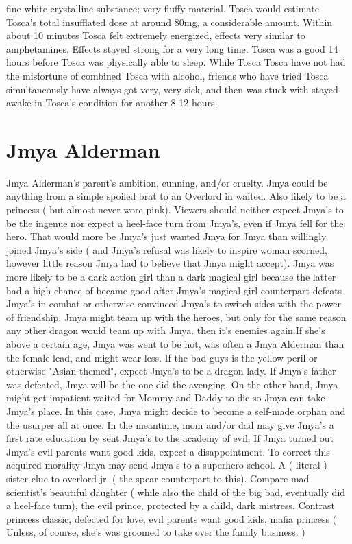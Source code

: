 \documentclass[12pt]{book}
\begin{document}
fine white crystalline substance; very fluffy material. Tosca would estimate Tosca's total insufflated dose at around 80mg, a considerable amount. Within about 10 minutes Tosca felt extremely energized, effects very similar to amphetamines. Effects stayed strong for a very long time. Tosca was a good 14 hours before Tosca was physically able to sleep. While Tosca Tosca have not had the misfortune of combined Tosca with alcohol, friends who have tried Tosca simultaneously have always got very, very sick, and then was stuck with stayed awake in Tosca's condition for another 8-12 hours.



\chapter{Jmya Alderman}

Jmya Alderman's parent's ambition, cunning, and/or cruelty. Jmya could be anything from a simple spoiled brat to an Overlord in waited. Also likely to be a princess ( but almost never wore pink). Viewers should neither expect Jmya's to be the ingenue nor expect a heel-face turn from Jmya's, even if Jmya fell for the hero. That would more be Jmya's just wanted Jmya for Jmya than willingly joined Jmya's side ( and Jmya's refusal was likely to inspire woman scorned, however little reason Jmya had to believe that Jmya might accept). Jmya was more likely to be a dark action girl than a dark magical girl because the latter had a high chance of became good after Jmya's magical girl counterpart defeats Jmya's in combat or otherwise convinced Jmya's to switch sides with the power of friendship. Jmya might team up with the heroes, but only for the same reason any other dragon would team up with Jmya. then it's enemies again.If she's above a certain age, Jmya was went to be hot, was often a Jmya Alderman than the female lead, and might wear less. If the bad guys is the yellow peril or otherwise "Asian-themed", expect Jmya's to be a dragon lady. If Jmya's father was defeated, Jmya will be the one did the avenging. On the other hand, Jmya might get impatient waited for Mommy and Daddy to die so Jmya can take Jmya's place. In this case, Jmya might decide to become a self-made orphan and the usurper all at once. In the meantime, mom and/or dad may give Jmya's a first rate education by sent Jmya's to the academy of evil. If Jmya turned out Jmya's evil parents want good kids, expect a disappointment. To correct this acquired morality Jmya may send Jmya's to a superhero school. A ( literal ) sister clue to overlord jr. ( the spear counterpart to this). Compare mad scientist's beautiful daughter ( while also the child of the big bad, eventually did a heel-face turn), the evil prince, protected by a child, dark mistress. Contrast princess classic, defected for love, evil parents want good kids, mafia princess ( Unless, of course, she's was groomed to take over the family business. )
\end{document}
